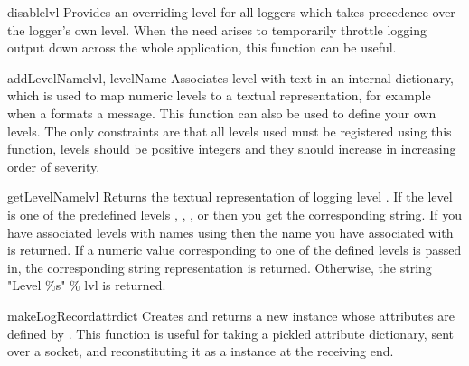 \begin{funcdesc}{disable}{lvl}
Provides an overriding level  for all loggers which takes
precedence over the logger's own level. When the need arises to
temporarily throttle logging output down across the whole application,
this function can be useful.
\end{funcdesc}

\begin{funcdesc}{addLevelName}{lvl, levelName}
Associates level  with text  in an internal
dictionary, which is used to map numeric levels to a textual
representation, for example when a  formats a message.
This function can also be used to define your own levels. The only
constraints are that all levels used must be registered using this
function, levels should be positive integers and they should increase
in increasing order of severity.
\end{funcdesc}

\begin{funcdesc}{getLevelName}{lvl}
Returns the textual representation of logging level . If the
level is one of the predefined levels ,
, ,  or 
then you get the corresponding string. If you have associated levels
with names using  then the name you have associated
with  is returned. If a numeric value corresponding to one of the
defined levels is passed in, the corresponding string representation is
returned. Otherwise, the string "Level \%s" \% lvl is returned.
\end{funcdesc}

\begin{funcdesc}{makeLogRecord}{attrdict}
Creates and returns a new  instance whose attributes are
defined by . This function is useful for taking a pickled
 attribute dictionary, sent over a socket, and reconstituting
it as a  instance at the receiving end.
\end{funcdesc}

